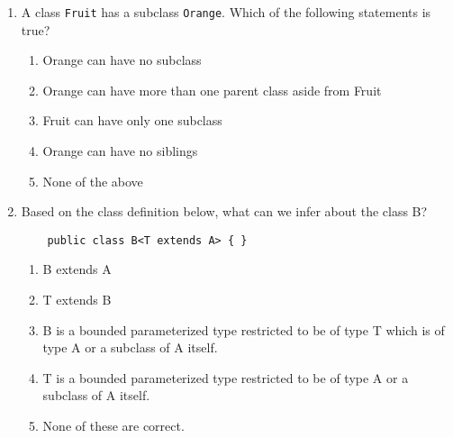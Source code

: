 \documentclass[S17-Final.tex]{subfiles}
\begin{document}
\begin{enumerate}
    
	
\clearpage
\item A class \texttt{Fruit} has a subclass \texttt{Orange}. Which of the following statements is true?
	
\begin{enumerate}
\item  Orange can have no subclass
\item  Orange can have more than one parent class aside from Fruit
\item  Fruit can have only one subclass
\item  Orange can have no siblings
\item  None of the above
\end{enumerate}

\item Based on the class definition below, what can we infer about the class B?
\begin{lstlisting}
    public class B<T extends A> { }
\end{lstlisting}
	
\begin{enumerate}
\item  B extends A
\item  T extends B
\item  B is a bounded parameterized type restricted to be of type T which is of type A or a subclass of A itself.
\item  T is a bounded parameterized type restricted to be of type A or a subclass of A itself.
\item  None of these are correct.
\end{enumerate}


\end{enumerate}
\end{document}
